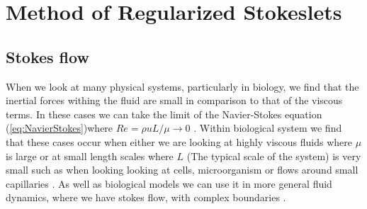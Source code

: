 \section{Method of Regularized Stokeslets}
\subsection{Stokes flow}
When we look at many physical systems, particularly in biology, we find that the inertial forces withing the fluid are small in comparison to that of the viscous terms. In these cases we can take the limit of the Navier-Stokes equation (\cref{eq:NavierStokes})where $R e=\rho u L/\mu \to 0 $ \cite{Trombley2019BasicFlows}. Within biological system we find that these cases occur when either we are looking at highly viscous fluids where $\mu$ is large or at small length scales where $L$ (The typical scale of the system) is very small such as when looking looking at cells, microorganism or flows around small capillaries \cite{Blake1972AOrganisms, Higdon1979APropulsion, Smith2009MathematicalFluids}. As well as biological models we can use it in more general fluid dynamics, where we have stokes flow, with complex boundaries \cite{Liron1978StokesPipe, Liron1976StokesPlates}. 

